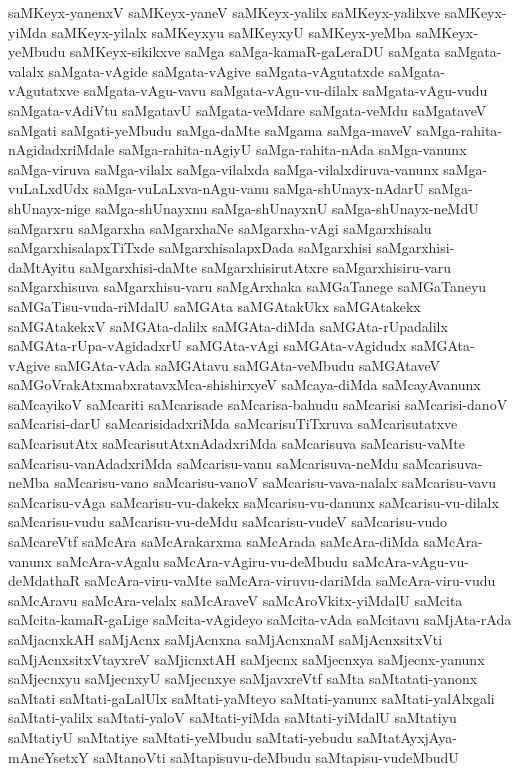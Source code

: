 {saMKeyx-yanenxV
saMKeyx-yaneV
saMKeyx-yalilx
saMKeyx-yalilxve
saMKeyx-yiMda
saMKeyx-yilalx
saMKeyxyu
saMKeyxyU
saMKeyx-yeMba
saMKeyx-yeMbudu
saMKeyx-sikikxve
saMga
saMga-kamaR-gaLeraDU
saMgata
saMgata-valalx
saMgata-vAgide
saMgata-vAgive
saMgata-vAgutatxde
saMgata-vAgutatxve
saMgata-vAgu-vavu
saMgata-vAgu-vu-dilalx
saMgata-vAgu-vudu
saMgata-vAdiVtu
saMgatavU
saMgata-veMdare
saMgata-veMdu
saMgataveV
saMgati
saMgati-yeMbudu
saMga-daMte
saMgama
saMga-maveV
saMga-rahita-nAgidadxriMdale
saMga-rahita-nAgiyU
saMga-rahita-nAda
saMga-vanunx
saMga-viruva
saMga-vilalx
saMga-vilalxda
saMga-vilalxdiruva-vanunx
saMga-vuLaLxdUdx
saMga-vuLaLxva-nAgu-vanu
saMga-shUnayx-nAdarU
saMga-shUnayx-nige
saMga-shUnayxnu
saMga-shUnayxnU
saMga-shUnayx-neMdU
saMgarxru
saMgarxha
saMgarxhaNe
saMgarxha-vAgi
saMgarxhisalu
saMgarxhisalapxTiTxde
saMgarxhisalapxDada
saMgarxhisi
saMgarxhisi-daMtAyitu
saMgarxhisi-daMte
saMgarxhisirutAtxre
saMgarxhisiru-varu
saMgarxhisuva
saMgarxhisu-varu
saMgArxhaka
saMGaTanege
saMGaTaneyu
saMGaTisu-vuda-riMdalU
saMGAta
saMGAtakUkx
saMGAtakekx
saMGAtakekxV
saMGAta-dalilx
saMGAta-diMda
saMGAta-rUpadalilx
saMGAta-rUpa-vAgidadxrU
saMGAta-vAgi
saMGAta-vAgidudx
saMGAta-vAgive
saMGAta-vAda
saMGAtavu
saMGAta-veMbudu
saMGAtaveV
saMGoVrakAtxmabxratavxMca-shishirxyeV
saMcaya-diMda
saMcayAvanunx
saMcayikoV
saMcariti
saMcarisade
saMcarisa-bahudu
saMcarisi
saMcarisi-danoV
saMcarisi-darU
saMcarisidadxriMda
saMcarisuTiTxruva
saMcarisutatxve
saMcarisutAtx
saMcarisutAtxnAdadxriMda
saMcarisuva
saMcarisu-vaMte
saMcarisu-vanAdadxriMda
saMcarisu-vanu
saMcarisuva-neMdu
saMcarisuva-neMba
saMcarisu-vano
saMcarisu-vanoV
saMcarisu-vava-nalalx
saMcarisu-vavu
saMcarisu-vAga
saMcarisu-vu-dakekx
saMcarisu-vu-danunx
saMcarisu-vu-dilalx
saMcarisu-vudu
saMcarisu-vu-deMdu
saMcarisu-vudeV
saMcarisu-vudo
saMcareVtf
saMcAra
saMcArakarxma
saMcArada
saMcAra-diMda
saMcAra-vanunx
saMcAra-vAgalu
saMcAra-vAgiru-vu-deMbudu
saMcAra-vAgu-vu-deMdathaR
saMcAra-viru-vaMte
saMcAra-viruvu-dariMda
saMcAra-viru-vudu
saMcAravu
saMcAra-velalx
saMcAraveV
saMcAroVkitx-yiMdalU
saMcita
saMcita-kamaR-gaLige
saMcita-vAgideyo
saMcita-vAda
saMcitavu
saMjAta-rAda
saMjacnxkAH
saMjAcnx
saMjAcnxna
saMjAcnxnaM
saMjAcnxsitxVti
saMjAcnxsitxVtayxreV
saMjicnxtAH
saMjecnx
saMjecnxya
saMjecnx-yanunx
saMjecnxyu
saMjecnxyU
saMjecnxye
saMjavxreVtf
saMta
saMtatati-yanonx
saMtati
saMtati-gaLalUlx
saMtati-yaMteyo
saMtati-yanunx
saMtati-yalAlxgali
saMtati-yalilx
saMtati-yaloV
saMtati-yiMda
saMtati-yiMdalU
saMtatiyu
saMtatiyU
saMtatiye
saMtati-yeMbudu
saMtati-yebudu
saMtatAyxjAya-mAneYsetxY
saMtanoVti
saMtapisuvu-deMbudu
saMtapisu-vudeMbudU
}
